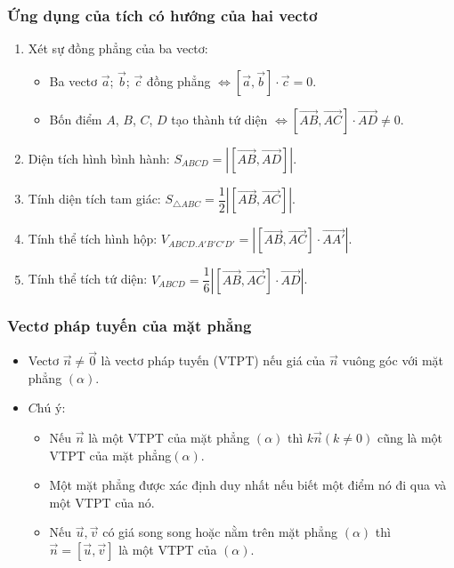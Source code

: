 \begin{tomtat}
	\subsubsection{Ứng dụng của tích có hướng của hai vectơ}
	\begin{enumerate}
		\item Xét sự đồng phẳng của ba vectơ:
		\begin{itemize}
			\item Ba vectơ $\vec{a}$; $\vec{b}$; $\vec{c}$ đồng phẳng $\Leftrightarrow \left[ \vec{a},\vec{b} \right]\cdot \vec{c}=0$.
			\item Bốn điểm $A$, $B$, $C$, $D$ tạo thành tứ diện $\Leftrightarrow \left[ \vec{AB},\vec{AC} \right]\cdot \vec{AD}\ne 0$.
		\end{itemize}
		\item Diện tích hình bình hành: $S_{ABCD}=\left| \left[ \vec{AB},\vec{AD} \right] \right|$.
		\item Tính diện tích tam giác: $S_{\triangle ABC}=\dfrac{1}{2}\left| \left[ \vec{AB},\vec{AC} \right] \right|$.
		\item Tính thể tích hình hộp: $V_{ABCD.A'B'C'D'}=\left| \left[ \vec{AB},\vec{AC} \right]\cdot\vec{AA'} \right|$.
		\item Tính thể tích tứ diện: $V_{ABCD}=\dfrac{1}{6}\left| \left[ \vec{AB},\vec{AC} \right]\cdot \vec{AD} \right|$.
	\end{enumerate}
\subsubsection{Vectơ pháp tuyến của mặt phẳng}
\begin{itemize}
	\item Vectơ $\overrightarrow{n}\neq \overrightarrow{0}$ là vectơ pháp tuyến (VTPT) nếu giá của $\overrightarrow{n}$ vuông góc với mặt phẳng $(\alpha)$.
	\item $\textit{Chú ý}$:
	\begin{itemize}
		\item Nếu $\overrightarrow{n}$ là một VTPT của mặt phẳng $(\alpha)$ thì $k\overrightarrow{n}$$(k\ne 0)$ cũng là một VTPT của mặt phẳng$(\alpha)$.
		\item Một mặt phẳng được xác định duy nhất nếu biết một điểm nó đi qua và một VTPT của nó.
		\item Nếu $\overrightarrow{u},\overrightarrow{v}$ có giá song song hoặc nằm trên mặt phẳng $(\alpha)$ thì $\overrightarrow{n}=\left[\overrightarrow{u},\overrightarrow{v}\right]$ là một VTPT của $(\alpha)$.
	\end{itemize}
\end{itemize}

\end{tomtat}
